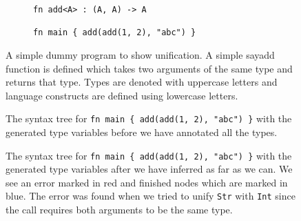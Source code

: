 \begin{figure}[h!]
\centering
\begin{subfigure}{.5\textwidth}
  \begin{verbatim}
fn add<A> : (A, A) -> A

fn main { add(add(1, 2), "abc") }
\end{verbatim}
  \end{subfigure}
  \caption{A simple dummy program to show unification. A simple say{add} function is defined which takes two arguments of the same type and returns that type. Types are denoted with uppercase letters and language constructs are defined using lowercase letters.}
  \label{fig:progUni}
\end{figure}

\begin{figure}[h!]
\centering
{}
  \cprotect\caption{The syntax tree for \verb|fn main { add(add(1, 2), "abc") }| with the generated type variables before we have annotated all the types.}
  \label{fig:progUniTree}
\end{figure}

\begin{figure}[h!]
\centering
{}
  \cprotect\caption{The syntax tree for \verb|fn main { add(add(1, 2), "abc") }| with the generated type variables after we have inferred as far as we can. We see an error marked in red and finished nodes which are marked in blue. The error was found when we tried to unify \verb|Str| with \verb|Int| since the call requires both arguments to be the same type.}
  \label{fig:progUniTreeAfter}
\end{figure}


